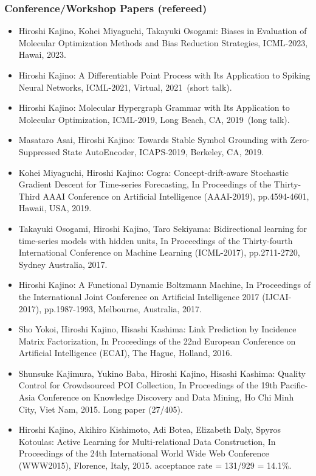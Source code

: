 \documentclass[a4paper,9pt]{article}
\begin{document}
\subsubsection*{Conference/Workshop Papers (refereed)}
\begin{itemize}
 \item Hiroshi Kajino, Kohei Miyaguchi, Takayuki Osogami: Biases in Evaluation of Molecular Optimization Methods and Bias Reduction Strategies, ICML-2023, Hawai, 2023.
 \item Hiroshi Kajino: A Differentiable Point Process with Its Application to Spiking Neural Networks, ICML-2021, Virtual, 2021~(short talk).
 \item Hiroshi Kajino: Molecular Hypergraph Grammar with Its Application to Molecular Optimization, ICML-2019, Long Beach, CA, 2019~(long talk).
 \item Masataro Asai, Hiroshi Kajino: Towards Stable Symbol Grounding with Zero-Suppressed State AutoEncoder, ICAPS-2019, Berkeley, CA, 2019.
 \item Kohei Miyaguchi, Hiroshi Kajino: Cogra: Concept-drift-aware Stochastic Gradient Descent for Time-series Forecasting, In Proceedings of the Thirty-Third AAAI Conference on Artificial Intelligence (AAAI-2019), pp.4594-4601, Hawaii, USA, 2019.
 \item Takayuki Osogami, Hiroshi Kajino, Taro Sekiyama: Bidirectional learning for time-series models with hidden units, In Proceedings of the Thirty-fourth International Conference on Machine Learning (ICML-2017), pp.2711-2720, Sydney Australia, 2017.
 \item Hiroshi Kajino: A Functional Dynamic Boltzmann Machine, In Proceedings of the International Joint Conference on Artificial Intelligence 2017 (IJCAI-2017), pp.1987-1993, Melbourne, Australia, 2017.
 \item Sho Yokoi, Hiroshi Kajino, Hisashi Kashima: Link Prediction by Incidence Matrix Factorization, In Proceedings of the 22nd European Conference on Artificial Intelligence (ECAI), The Hague, Holland, 2016.
 \item Shunsuke Kajimura, Yukino Baba, Hiroshi Kajino, Hisashi Kashima: Quality Control for Crowdsourced POI Collection, In Proceedings of the 19th Pacific-Asia Conference on Knowledge Discovery and Data Mining, Ho Chi Minh City, Viet Nam, 2015. Long paper (27/405).
 \item Hiroshi Kajino, Akihiro Kishimoto, Adi Botea, Elizabeth Daly, Spyros Kotoulas: Active Learning for Multi-relational Data Construction, In Proceedings of the 24th International World Wide Web Conference (WWW2015), Florence, Italy, 2015. acceptance rate = 131/929 = 14.1\%.

\end{itemize}
\end{document}
